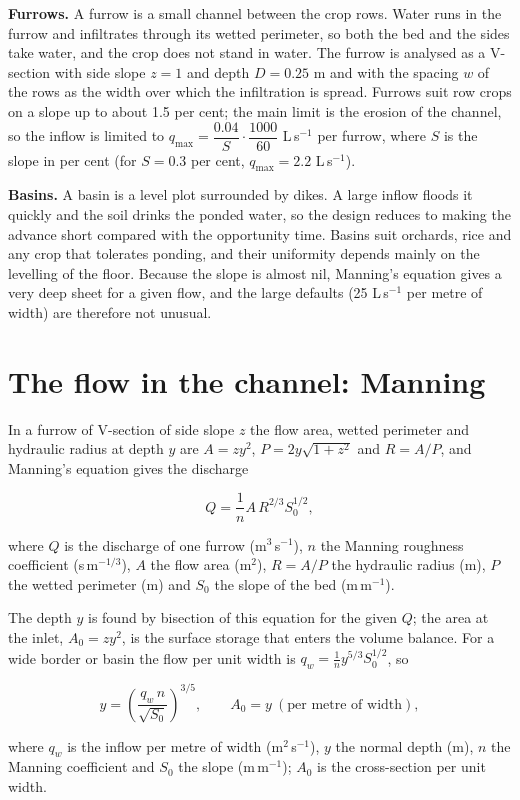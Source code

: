 \textbf{Furrows.} A furrow is a small channel between the crop rows. Water runs in the furrow and infiltrates through its wetted perimeter, so both the bed and the sides take water, and the crop does not stand in water. The furrow is analysed as a V-section with side slope $z=1$ and depth $D=0.25$ m and with the spacing $w$ of the rows as the width over which the infiltration is spread. Furrows suit row crops on a slope up to about 1.5 per cent; the main limit is the erosion of the channel, so the inflow is limited to $q_{\max}=\dfrac{0.04}{S}\cdot\dfrac{1000}{60}$ L\,s$^{-1}$ per furrow, where $S$ is the slope in per cent (for $S=0.3$ per cent, $q_{\max}=2.2$ L\,s$^{-1}$).

\textbf{Basins.} A basin is a level plot surrounded by dikes. A large inflow floods it quickly and the soil drinks the ponded water, so the design reduces to making the advance short compared with the opportunity time. Basins suit orchards, rice and any crop that tolerates ponding, and their uniformity depends mainly on the levelling of the floor. Because the slope is almost nil, Manning's equation gives a very deep sheet for a given flow, and the large defaults (25 L\,s$^{-1}$ per metre of width) are therefore not unusual.

\section{The flow in the channel: Manning}
In a furrow of V-section of side slope $z$ the flow area, wetted perimeter and hydraulic radius at depth $y$ are $A=zy^2$, $P=2y\sqrt{1+z^2}$ and $R=A/P$, and Manning's equation gives the discharge

\begin{equation}\boxed{Q=\frac{1}{n}A\,R^{2/3}S_0^{1/2},}\label{eq:s-man}\end{equation}
\par\noindent where $Q$ is the discharge of one furrow (m$^3$\,s$^{-1}$), $n$ the Manning roughness coefficient (s\,m$^{-1/3}$), $A$ the flow area (m$^2$), $R=A/P$ the hydraulic radius (m), $P$ the wetted perimeter (m) and $S_0$ the slope of the bed (m\,m$^{-1}$).



The depth $y$ is found by bisection of this equation for the given $Q$; the area at the inlet, $A_0=zy^2$, is the surface storage that enters the volume balance. For a wide border or basin the flow per unit width is $q_w=\frac1n y^{5/3}S_0^{1/2}$, so

\begin{equation}\boxed{y=\left(\frac{q_w\,n}{\sqrt{S_0}}\right)^{3/5},\qquad A_0=y\ (\text{per metre of width}),}\label{eq:s-wide}\end{equation}
\par\noindent where $q_w$ is the inflow per metre of width (m$^2$\,s$^{-1}$), $y$ the normal depth (m), $n$ the Manning coefficient and $S_0$ the slope (m\,m$^{-1}$); $A_0$ is the cross-section per unit width.



